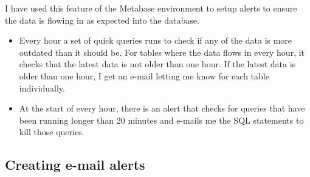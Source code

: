 \documentclass[
]{book}
\begin{document}
I have used this feature of the Metabase environment to setup alerts to ensure the data is flowing in as expected into the database.

\begin{itemize}
\item
  Every hour a set of quick queries runs to check if any of the data is more outdated than it should be. For tables where the data flows in every hour, it checks that the latest data is not older than one hour. If the latest data is older than one hour, I get an e-mail letting me know for each table individually.
\item
  At the start of every hour, there is an alert that checks for queries that have been running longer than 20 minutes and e-mails me the SQL statements to kill those queries.
\end{itemize}

\hypertarget{creating-e-mail-alerts}{%
\subsection{Creating e-mail alerts}\label{creating-e-mail-alerts}}
\end{document}
